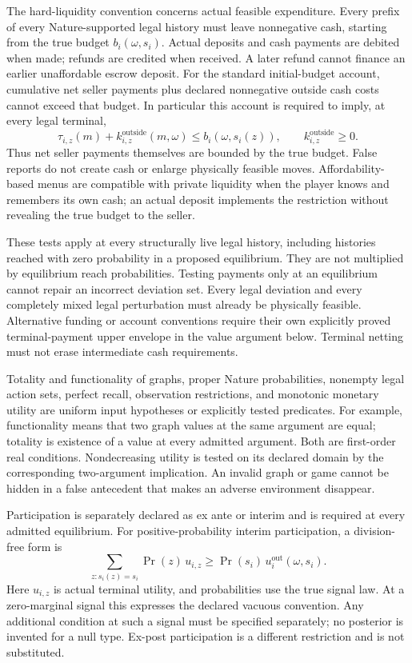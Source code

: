 \documentclass[11pt,a4paper]{article}
\numberwithin{equation}{section}
\theoremstyle{definition}
\begin{document}
The hard-liquidity convention concerns actual feasible expenditure.
Every prefix of every Nature-supported legal history must leave
nonnegative cash, starting from the true budget \(b_i(\omega,s_i)\).
Actual deposits and cash payments are debited when made; refunds are
credited when received. A later refund cannot finance an earlier
unaffordable escrow deposit.
For the standard initial-budget account, cumulative net seller payments
plus declared nonnegative outside cash costs cannot exceed that budget.
In particular this account is required to imply, at every legal terminal,
\[
 \tau_{i,z}(m)+k_{i,z}^{\mathrm{outside}}(m,\omega)
 \le b_i(\omega,s_i(z)),\qquad
 k_{i,z}^{\mathrm{outside}}\ge0.
\]
Thus net seller payments themselves are bounded by the true budget.
False reports do not create cash or enlarge physically feasible moves.
Affordability-based menus are compatible with private liquidity when
the player knows and remembers its own cash; an actual deposit
implements the restriction without revealing the true budget to the seller.

These tests apply at every structurally live legal history, including
histories reached with zero probability in a proposed equilibrium.
They are not multiplied by equilibrium reach probabilities.
Testing payments only at an equilibrium cannot repair an incorrect
deviation set. Every legal deviation and every completely mixed legal
perturbation must already be physically feasible.
Alternative funding or account conventions require their own
explicitly proved terminal-payment upper envelope in the value argument
below. Terminal netting must not erase intermediate cash requirements.

Totality and functionality of graphs, proper Nature probabilities,
nonempty legal action sets, perfect recall, observation restrictions,
and monotonic monetary utility are uniform input hypotheses or
explicitly tested predicates.
For example, functionality means that two graph values at the same
argument are equal; totality is existence of a value at every admitted
argument. Both are first-order real conditions.
Nondecreasing utility is tested on its declared domain by the
corresponding two-argument implication.
An invalid graph or game cannot be hidden in a false antecedent that
makes an adverse environment disappear.

Participation is separately declared as ex ante or interim and is
required at every admitted equilibrium.
For positive-probability interim participation, a division-free form is
\begin{equation}\label{eq:interimIR}
 \sum_{z:s_i(z)=s_i}\Pr(z)\,u_{i,z}
 \ge \Pr(s_i)\,u_i^{\mathrm{out}}(\omega,s_i).
\end{equation}
Here \(u_{i,z}\) is actual terminal utility, and probabilities use the
true signal law. At a zero-marginal signal this expresses the declared
vacuous convention. Any additional condition at such a signal must
be specified separately; no posterior is invented for a null type.
Ex-post participation is a different restriction and is not substituted.
\end{document}
